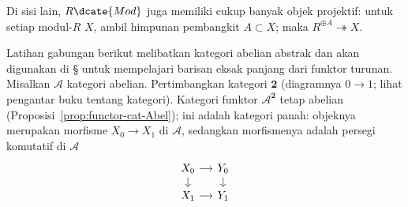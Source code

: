 Di sisi lain, $R\dcate{Mod}$ juga memiliki cukup banyak objek projektif: untuk
setiap modul-$R$ $X$, ambil himpunan pembangkit $A\subset X$;
maka $R^{\oplus A}\twoheadrightarrow X$.

\begin{contoh}\label{eg:A2-injective-projective}
Latihan gabungan berikut melibatkan kategori abelian abstrak dan akan digunakan
di \S{} untuk mempelajari barisan eksak panjang dari
funktor turunan. Misalkan $\mathcal{A}$ kategori abelian. Pertimbangkan kategori
$\mathbf{2}$ (diagramnya $0\to1$; lihat pengantar buku tentang kategori).
Kategori funktor $\mathcal{A}^{\mathbf{2}}$ tetap abelian
(Proposisi~\ref{prop:functor-cat-Abel}); ini adalah kategori panah: objeknya
merupakan morfisme $X_0\to X_1$ di $\mathcal{A}$, sedangkan morfismenya adalah
persegi komutatif di $\mathcal{A}$
\[\begin{tikzcd}[row sep=small, column sep=small]
	X_0 \arrow[r] \arrow[d] & Y_0 \arrow[d] \\
	X_1 \arrow[r] & Y_1
\end{tikzcd}\]


\end{contoh}
